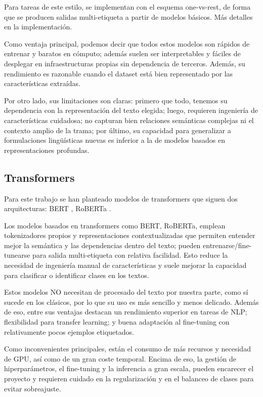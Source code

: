 \documentclass[11pt,spanish,listoffigures,listoftables]{tfgetsinf}
\begin{document}
Para tareas de este estilo, se implementan con el esquema one-vs-rest, de forma que se producen salidas multi-etiqueta a partir de modelos básicos. Más detalles en la implementación.

Como ventaja principal, podemos decir que todos estos modelos son rápidos de entrenar y baratos en cómputo; además suelen ser interpretables y fáciles de desplegar en infraestructuras propias sin dependencia de terceros. Además, su rendimiento es razonable cuando el dataset está bien representado por las características extraídas.

Por otro lado, sus limitaciones son claras: primero que todo, tenemos su dependencia con la representación del texto elegida; luego, requieren ingeniería de características cuidadosa; no capturan bien relaciones semánticas complejas ni el contexto amplio de la trama; por último, su capacidad para generalizar a formulaciones lingüísticas nuevas es inferior a la de modelos basados en representaciones profundas.

\subsection{Transformers}
Para este trabajo se han planteado modelos de transformers que siguen dos arquitecturas: BERT \cite{devlin-2018}, RoBERTa \cite{liu-2019}.

Los modelos basados en transformers como BERT, RoBERTa, emplean tokenizadores propios y representaciones contextualizadas que permiten entender mejor la semántica y las dependencias dentro del texto; pueden entrenarse/fine-tunearse para salida multi-etiqueta con relativa facilidad. Esto reduce la necesidad de ingeniería manual de características y suele mejorar la capacidad para clasificar o identificar clases en los textos.

Estos modelos NO necesitan de procesado del texto por nuestra parte, como sí sucede en los clásicos, por lo que su uso es más sencillo y menos delicado. Además de eso, entre sus ventajas destacan un rendimiento superior en tareas de NLP; flexibilidad para transfer learning; y buena adaptación al fine-tuning con relativamente pocos ejemplos etiquetados. 

Como inconvenientes principales, están el consumo de más recursos y necesidad de GPU, así como de un gran coste temporal. Encima de eso, la gestión de hiperparámetros, el fine-tuning y la inferencia a gran escala, pueden encarecer el proyecto y requieren cuidado en la regularización y en el balanceo de clases para evitar sobreajuste.
\end{document}
